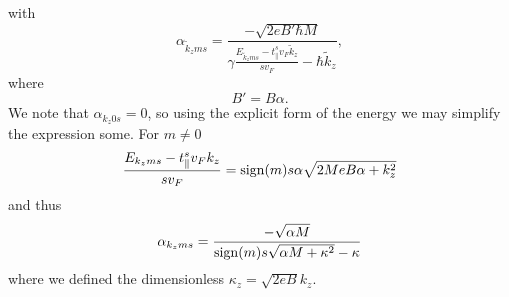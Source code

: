 with
\begin{equation}
  \alpha_{\tilde{k}_z m s} = \frac{-\sqrt{2e B' \hbar M}}{ \gamma \frac{E_{\tilde{k}_z m s} - t^s_{\parallel} v_{F} \tilde{k}_{z}}{s v_{F}} - \hbar  \tilde{k}_z},
\end{equation}
where
\[
B' = B \alpha.
\]
We note that \( \alpha_{k_z 0 s} = 0 \), so using the explicit form of the energy we may simplify the expression some.
For \( m\neq 0 \)
\[
  \frac{
    E_{k_z m s} - t^s_{\parallel} v_F k_z
  }{s v_{F}} = \operatorname{sign}(m) s \alpha \sqrt{2 M e B \alpha + k_{z}^2}
\]
and thus
\begin{equation}
  \label{eq:35}
  \alpha_{k_z m s} =
  \frac{-\sqrt{ \alpha M }}{\operatorname{sign}(m) s \sqrt{\alpha M + \kappa^2} - \kappa}
\end{equation}
where we defined the dimensionless \( \kappa_z = \sqrt{2 e B} k_z  \).


